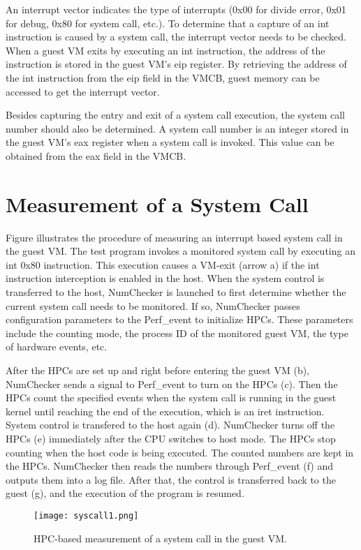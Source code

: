 \documentclass[12pt]{report}
\begin{document}
An interrupt vector indicates the type of interrupts (0x00
for divide error, 0x01 for debug, 0x80 for system call, etc.).
To determine that a capture of an int instruction is caused by
a system call, the interrupt vector needs to be checked. When
a guest VM exits by executing an int instruction, the address
of the instruction is stored in the guest VM’s eip register. By
retrieving the address of the int instruction from the eip
field in the VMCB,  guest memory can be accessed to get the
interrupt vector.

Besides capturing the entry and exit of a system call
execution, the system call number should also be determined.
A system call number is an integer stored in the guest VM’s
eax register when a system call is invoked. This value can be
obtained from the eax field in the VMCB.

\section{Measurement of a System Call}
 Figure illustrates the procedure of measuring an interrupt based
system call in the guest VM. The test program invokes a
monitored system call by executing an int 0x80 instruction.
This execution causes a VM-exit (arrow a) if
the int instruction interception is enabled in the host. When
the system control is transferred to the host, NumChecker is
launched to first determine whether the current system call
needs to be monitored. If so, NumChecker passes configuration
parameters to the Perf\_event to initialize HPCs. These
parameters include the counting mode, the process ID of the
monitored guest VM, the type of hardware events, etc.

After the HPCs are set up and right before entering the
guest VM (b), NumChecker sends a signal to Perf\_event to
turn on the HPCs (c). Then the HPCs count the specified
events when the system call is running in the guest kernel
until reaching the end of the execution, which is an iret
instruction. System control is transfered to the host again (d).
NumChecker turns off the HPCs (e) immediately after the CPU
switches to host mode. The HPCs stop counting when the
host code is being executed. The counted numbers are kept
in the HPCs. NumChecker then reads the numbers through
Perf\_event (f) and outputs them into a log file. After that, the
control is transferred back to the guest (g), and the execution
of the program is resumed.

\begin{figure}[h]
\centering
\texttt{[image: syscall1.png]}
\caption{HPC-based measurement of a system call in the guest VM.}
\end{figure}
\end{document}
